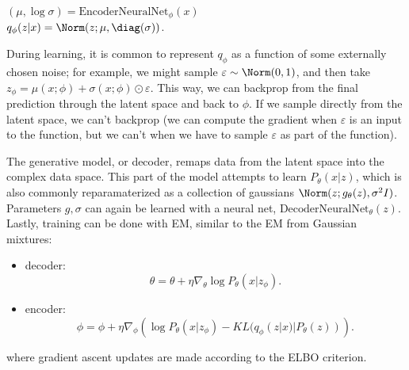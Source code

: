\begin{center}
	$(\mu, \log \sigma) = \text{EncoderNeuralNet}_{\phi}(x)$ \\
	$q_{\phi}(z|x) = \Norm(z; \mu, \text{\diag}(\sigma))$.
\end{center}

During learning, it is common to represent $q_{\phi}$ as a function of some externally chosen noise; for example, we might sample $\varepsilon\sim \Norm(0,1)$, and then take $z_{\phi} = \mu(x;\phi) + \sigma(x;\phi)\odot \varepsilon$. This way, we can backprop from the final prediction through the latent space and back to $\phi$. If we sample directly from the latent space, we can't backprop (we can compute the gradient when $\varepsilon$ is an input to the function, but we can't when we have to sample $\varepsilon$ as part of the function). 

The \ac{generative model}, or \ac{decoder}, remaps data from the latent space into the complex data space. This part of the model attempts to learn $P_{\theta}(x|z)$, which is also commonly reparamaterized as a collection of gaussians $\Norm(z;g_{\theta}(z), \sigma^2I)$. Parameters $g,\sigma$ can again be learned with a neural net, $\text{DecoderNeuralNet}_{\theta}(z)$. Lastly, training can be done with EM, similar to the EM from Gaussian mixtures: 
\begin{itemize}
	\item decoder: 
		\[\theta = \theta + \eta \nabla_{\theta}\log P_{\theta}(x|z_{\phi}).\]
	\item encoder: 
		\[\phi = \phi + \eta \nabla_{\phi}\left(\log P_{\theta}(x|z_{\phi}) - KL(q_{\phi}(z|x) | P_{\theta}(z))\right).\] 
\end{itemize}
where gradient ascent updates are made according to the ELBO criterion.


